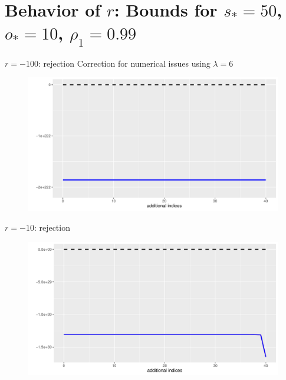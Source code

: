 \documentclass[aspectratio=169]{beamer}
\begin{document}

\section{Behavior of $r$: Bounds for $s_*=50$, $o_*=10$, $\rho_1=0.99$}

\begin{frame}{$r=-100$: rejection}
Correction for numerical issues using $\lambda=6$
\begin{figure}
\centering
\includegraphics[scale=0.6]{plot100n.pdf}
\end{figure}
\end{frame}



\begin{frame}{$r=-10$: rejection}
\begin{figure}
\centering
\includegraphics[scale=0.6]{plot10n.pdf}
\end{figure}
\end{frame}
\end{document}

